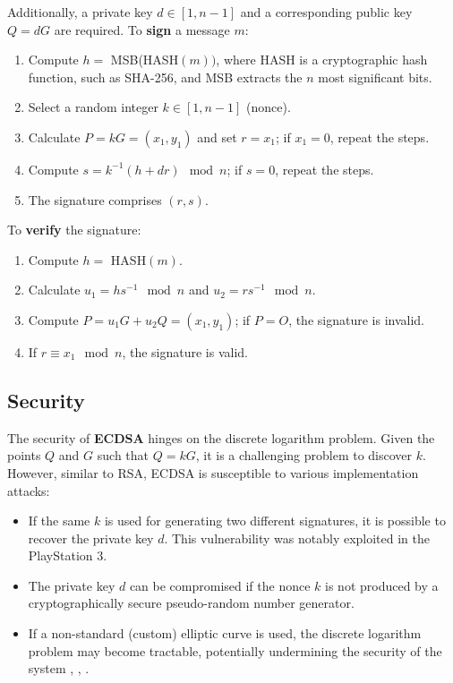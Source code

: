 \documentclass[a4paper,12pt]{report}
\begin{document}
Additionally, a private key $d \in [1, n-1]$ and a corresponding public key $Q = dG$ are required. To \textbf{sign} a message $m$:

\begin{enumerate}
    \item Compute $h = $ MSB(HASH$(m))$, where HASH is a cryptographic hash function, such as SHA-256, and MSB extracts the $n$ most significant bits.
    \item Select a random integer $k \in [1, n-1]$ (nonce).
    \item Calculate $P = kG = (x_1, y_1)$ and set $r = x_1$; if $x_1 = 0$, repeat the steps.
    \item Compute $s = k^{-1}(h + dr) \mod n$; if $s = 0$, repeat the steps.
    \item The signature comprises $(r, s)$.
\end{enumerate}

\clearpage

To \textbf{verify} the signature:

\begin{enumerate}
    \item Compute $h = $ HASH$(m)$.
    \item Calculate $u_1 = hs^{-1} \mod n$ and $u_2 = rs^{-1} \mod n$.
    \item Compute $P = u_1G + u_2Q = (x_1, y_1)$; if $P = O$, the signature is invalid.
    \item If $r \equiv x_1 \mod n$, the signature is valid.
\end{enumerate}

\subsection{Security}

The security of \textbf{ECDSA} hinges on the discrete logarithm problem.
Given the points $Q$ and $G$ such that $Q = kG$, it is a challenging problem to discover $k$. However, similar to RSA, ECDSA is susceptible to various implementation attacks:

\begin{itemize}
    \item If the same $k$ is used for generating two different signatures, it is possible to recover the private key $d$. This vulnerability was notably exploited in the PlayStation 3.
    \item The private key $d$ can be compromised if the nonce $k$ is not produced by a cryptographically secure pseudo-random number generator.
    \item If a non-standard (custom) elliptic curve is used, the discrete logarithm problem may become tractable, potentially undermining the security of the system \cite{giuliani99attackson}, \cite{mov}, \cite{smartass}.
\end{itemize}
\end{document}
